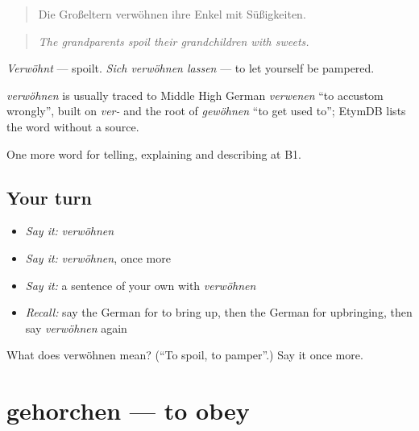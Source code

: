 \begin{quote}
Die Großeltern verwöhnen ihre Enkel mit Süßigkeiten.
\end{quote}

\begin{quote}
\emph{The grandparents spoil their grandchildren with sweets.}
\end{quote}

\emph{Verwöhnt} — spoilt. \emph{Sich verwöhnen lassen} — to let yourself be pampered.

\begin{cousinweb}
\emph{verwöhnen} is usually traced to Middle High German \emph{verwenen} \textquotedblleft{}to accustom wrongly\textquotedblright{}, built on \emph{ver-} and the root of \emph{gewöhnen} \textquotedblleft{}to get used to\textquotedblright{}; EtymDB lists the word without a source.
\end{cousinweb}

\begin{grammarlens}[title={What you've built}]
One more word for telling, explaining and describing at B1.
\end{grammarlens}

\subsection*{Your turn}
\begin{itemize}
\raggedright
  \item \emph{Say it:} \emph{verwöhnen}
  \item \emph{Say it:} \emph{verwöhnen}, once more
  \item \emph{Say it:} a sentence of your own with \emph{verwöhnen}
  \item \emph{Recall:} say the German for to bring up, then the German for upbringing, then say \emph{verwöhnen} again
\end{itemize}

\begin{tcolorbox}[breakable,colback=teal!4,colframe=teal!35!black,title={Before you move on}]
What does verwöhnen mean? (\textquotedblleft{}To spoil, to pamper\textquotedblright{}.) Say it once more.
\end{tcolorbox}
\section[gehorchen]{gehorchen — to obey}

\label{lesson:GE-C495-gehorchen}



